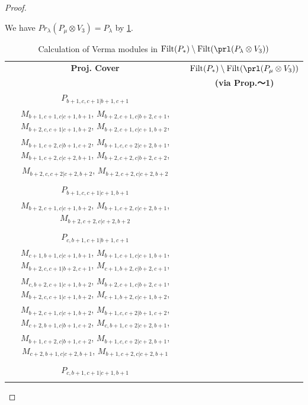 \begin{proof}
\begin{enumerate}
\begin{enumerate}
       We have $Pr_{\lambda}(P_\mu \otimes V_{3}) = P_\lambda  $ by \cref{tab:verma-analysis_10}.
\begin{table}[htbp]
\centering
\caption{Calculation of Verma modules in $\operatorname{Filt}(P_*) \setminus \operatorname{Filt}(\prl(P_\lambda \otimes V_{3})) $ } \label{tab:verma-analysis_10}
\begin{tabular}{cc}
\toprule
\textbf{Proj. Cover} & \textbf{$\operatorname{Filt}(P_*) \setminus \operatorname{Filt}(\prl(P_\mu \otimes V_{3})) $}  \\
     & \textbf{(via Prop.～1)}  \\
\midrule
 $P_{b+1,c,c+1|b+1,c+1}$ & \makecell{
 $M_{b+2,c,c+1|b+2,c+1}$,
 $M_{b+1,c,c+2|b+1,c+2}$,
 $M_{b+2,c,c+2|b+2,c+2}$,
 $M_{b+1,c+1,c|b+1,c+1}$, \\
 $M_{b+1,c+1,c|c+1,b+1}$,
 $M_{b+2,c+1,c|b+2,c+1}$,
 $M_{b+2,c,c+1|c+1,b+2}$,
 $M_{b+2,c+1,c|c+1,b+2}$, \\
 $M_{b+1,c+2,c|b+1,c+2}$,
 $M_{b+1,c,c+2|c+2,b+1}$,
 $M_{b+1,c+2,c|c+2,b+1}$,
 $M_{b+2,c+2,c|b+2,c+2}$, \\
 $M_{b+2,c,c+2|c+2,b+2}$,
 $M_{b+2,c+2,c|c+2,b+2}$
}\\
 & \\
 $P_{b+1,c,c+1|c+1,b+1}$ & \makecell{
 $M_{b+2,c,c+1|c+1,b+2}$,
 $M_{b+1,c,c+2|c+2,b+1}$,
 $M_{b+2,c,c+2|c+2,b+2}$,
 $M_{b+1,c+1,c|c+1,b+1}$, \\
 $M_{b+2,c+1,c|c+1,b+2}$,
 $M_{b+1,c+2,c|c+2,b+1}$,
 $M_{b+2,c+2,c|c+2,b+2}$
}\\
 & \\
 $P_{c,b+1,c+1|b+1,c+1}$ & \makecell{
 $M_{c,b+2,c+1|b+2,c+1}$,
 $M_{c,b+1,c+2|b+1,c+2}$,
 $M_{c+1,b+1,c|b+1,c+1}$,
 $M_{b+1,c+1,c|b+1,c+1}$, \\
 $M_{c+1,b+1,c|c+1,b+1}$,
 $M_{b+1,c+1,c|c+1,b+1}$,
 $M_{b+2,c,c+1|b+2,c+1}$,
 $M_{c+1,b+2,c|b+2,c+1}$, \\
 $M_{c,b+2,c+1|c+1,b+2}$,
 $M_{b+2,c+1,c|b+2,c+1}$,
 $M_{b+2,c,c+1|c+1,b+2}$,
 $M_{c+1,b+2,c|c+1,b+2}$, \\
 $M_{b+2,c+1,c|c+1,b+2}$,
 $M_{b+1,c,c+2|b+1,c+2}$,
 $M_{c+2,b+1,c|b+1,c+2}$,
 $M_{c,b+1,c+2|c+2,b+1}$, \\
 $M_{b+1,c+2,c|b+1,c+2}$,
 $M_{b+1,c,c+2|c+2,b+1}$,
 $M_{c+2,b+1,c|c+2,b+1}$,
 $M_{b+1,c+2,c|c+2,b+1}$
}\\
 & \\
 $P_{c,b+1,c+1|c+1,b+1}$ & \makecell{
 $M_{c,b+2,c+1|c+1,b+2}$,
 $M_{c,b+1,c+2|c+2,b+1}$,
 $M_{c,b+2,c+2|c+2,b+2}$,
 $M_{c+1,b+1,c|c+1,b+1}$, \\
}
\end{tabular}
\end{table}
\end{enumerate}
\end{enumerate}
\end{proof}
